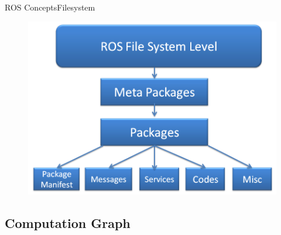 \documentclass{beamer}
\begin{document}
\begin{frame}{ROS Concepts}{Filesystem}
\begin{figure}
\centering
\includegraphics[scale=0.4]{figs/filesystem}
\end{figure}
  
\end{frame}


\subsection{Computation Graph}
\end{document}
